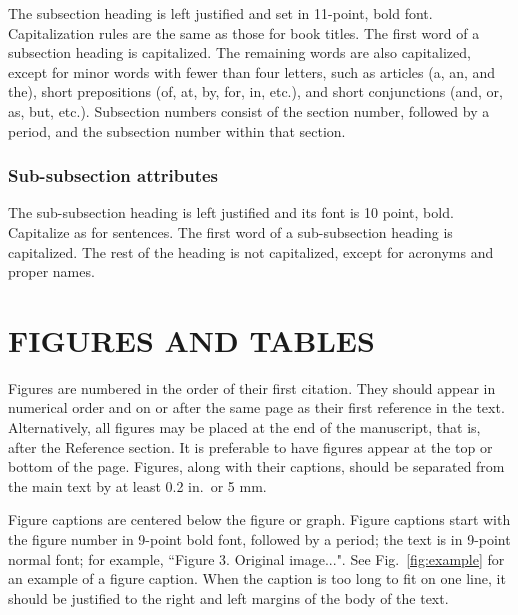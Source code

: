 \documentclass[]{spie}  %
\begin{document}
The subsection heading is left justified and set in 11-point, bold font.  Capitalization rules are the same as those for book titles.  The first word of a subsection heading is capitalized.  The remaining words are also capitalized, except for minor words with fewer than four letters, such as articles (a, an, and the), short prepositions (of, at, by, for, in, etc.), and short conjunctions (and, or, as, but, etc.).  Subsection numbers consist of the section number, followed by a period, and the subsection number within that section.  

\subsubsection{Sub-subsection attributes} 
The sub-subsection heading is left justified and its font is 10 point, bold.  Capitalize as for sentences.  The first word of a sub-subsection heading is capitalized.  The rest of the heading is not capitalized, except for acronyms and proper names.  

\section{FIGURES AND TABLES} 

Figures are numbered in the order of their first citation.  They should appear in numerical order and on or after the same page as their first reference in the text.  Alternatively, all figures may be placed at the end of the manuscript, that is, after the Reference section.  It is preferable to have figures appear at the top or bottom of the page.  Figures, along with their captions, should be separated from the main text by at least 0.2 in.\ or 5 mm.  

Figure captions are centered below the figure or graph.  Figure captions start with the figure number in 9-point bold font, followed by a period; the text is in 9-point normal font; for example, ``{\footnotesize{Figure 3.}  Original image...}".  See Fig.~\ref{fig:example} for an example of a figure caption.  When the caption is too long to fit on one line, it should be justified to the right and left margins of the body of the text.  
\end{document}
